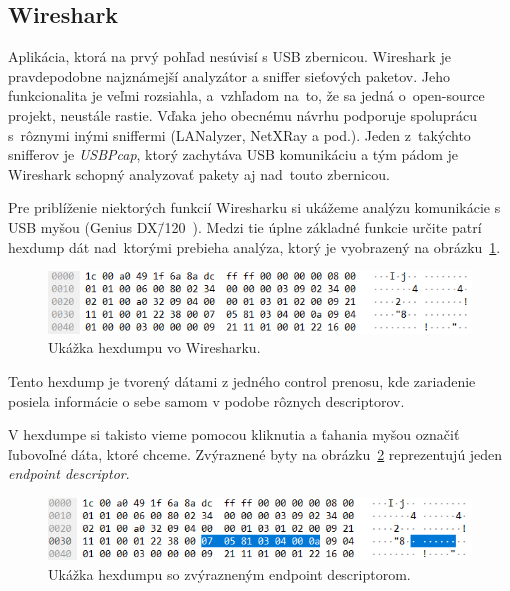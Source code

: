 \subsection*{Wireshark}
\label{uvod:sec:Wireshark}

Aplikácia, ktorá na prvý pohľad nesúvisí s USB zbernicou. Wireshark je pravdepodobne najznámejší analyzátor a sniffer sieťových paketov. Jeho funkcionalita je veľmi rozsiahla, a~vzhľadom na~to, že sa jedná o~open-source projekt, neustále rastie. Vďaka jeho obecnému návrhu podporuje spoluprácu s~rôznymi inými sniffermi (LANalyzer, NetXRay a pod.). Jeden z~takýchto snifferov je \textit{USBPcap}, ktorý zachytáva USB komunikáciu a tým pádom je Wireshark schopný analyzovať pakety aj nad~touto zbernicou. 

Pre priblíženie niektorých funkcií Wiresharku si ukážeme analýzu komunikácie s USB myšou (Genius DX\=/120~\cite{genius_mouse}). Medzi tie úplne základné funkcie určite patrí hexdump dát nad~ktorými prebieha analýza, ktorý je vyobrazený na obrázku~\ref{obr:uvod:wireshark_hexdump}. 

\begin{figure}[!htb]
	\centering
	\includegraphics[width=12cm]{img/uvod_wireshark_hexdump}
	\caption{Ukážka hexdumpu vo Wiresharku.}
	\label{obr:uvod:wireshark_hexdump}
\end{figure}


Tento hexdump je tvorený dátami z jedného control prenosu, kde zariadenie posiela informácie o sebe samom v podobe rôznych descriptorov. 

V hexdumpe si takisto vieme pomocou kliknutia a ťahania myšou označiť ľubovoľné dáta, ktoré chceme. Zvýraznené byty na obrázku~\ref{obr:uvod:wireshark_hexdump_endpoint} reprezentujú jeden \textit{endpoint descriptor}.

\begin{figure}[!htb]
	\centering
	\includegraphics[width=12cm]{img/uvod_wireshark_hexdump_endpoint}
	\caption{Ukážka hexdumpu so zvýrazneným endpoint descriptorom.}
	\label{obr:uvod:wireshark_hexdump_endpoint}
\end{figure}

